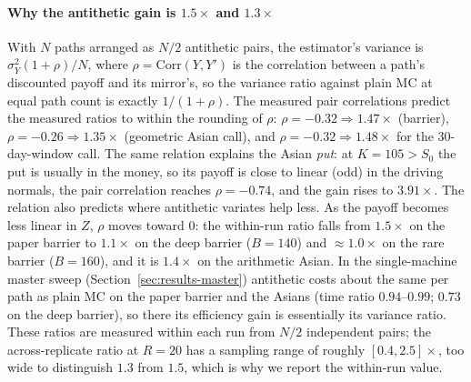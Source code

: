 \documentclass[sigconf]{acmart}
\begin{document}
\paragraph{Why the antithetic gain is $1.5\times$ and $1.3\times$} With $N$
paths arranged as $N/2$ antithetic pairs, the estimator's variance is
$\sigma_Y^2(1+\rho)/N$, where $\rho=\mathrm{Corr}(Y,Y')$ is the correlation
between a path's discounted payoff and its mirror's, so the variance ratio
against plain MC at equal path count is exactly $1/(1+\rho)$. The measured
pair correlations predict the measured ratios to within the rounding of $\rho$:
$\rho=-0.32\Rightarrow1.47\times$ (barrier), $\rho=-0.26\Rightarrow1.35\times$
(geometric Asian call), and $\rho=-0.32\Rightarrow1.48\times$ for the
30-day-window call. The same relation explains the Asian \emph{put}: at
$K=105>S_0$ the put is usually in the money, so its payoff is close to
linear (odd) in the driving normals, the pair correlation reaches
$\rho=-0.74$, and the gain rises to $3.91\times$. The relation also predicts
where antithetic variates help less. As the payoff becomes less linear in
$Z$, $\rho$ moves toward $0$: the within-run ratio falls from $1.5\times$ on
the paper barrier to $1.1\times$ on the deep barrier ($B=140$) and
$\approx1.0\times$ on the rare barrier ($B=160$), and it is $1.4\times$ on
the arithmetic Asian. In the single-machine master sweep
(Section~\ref{sec:results-master}) antithetic costs about the same per path
as plain MC on the paper barrier and the Asians (time ratio $0.94$--$0.99$; $0.73$ on the deep barrier), so there its efficiency gain is essentially its variance ratio. These ratios are measured within each run
from $N/2$ independent pairs; the across-replicate ratio at $R=20$ has a
sampling range of roughly $[0.4,2.5]\times$, too wide to distinguish $1.3$
from $1.5$, which is why we report the within-run value.
\end{document}
